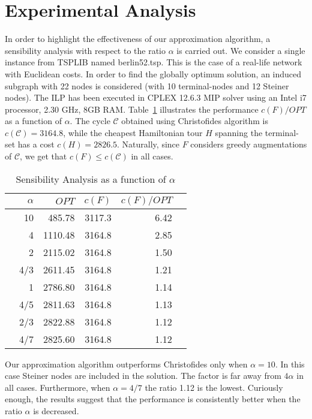 \documentclass{endm}
\begin{document}
\clearpage
\section{Experimental Analysis}\label{Comparison}
In order to highlight the effectiveness of our approximation algorithm, a sensibility
analysis with respect to the ratio $\alpha$ is carried out. We consider a single
instance from TSPLIB named berlin52.tsp. This is the case of a real-life network
with Euclidean costs. In order to find the globally optimum solution, an
induced subgraph with 22 nodes is considered (with 10  terminal-nodes and 12 Steiner nodes).
The ILP has been executed in CPLEX 12.6.3 MIP solver using an Intel i7 processor, 2.30 GHz, 8GB RAM.
Table~\ref{Table:resul1} illustrates the performance $c(F)/OPT$ as a function
of $\alpha$. The cycle $\mathcal{C}$ obtained using Christofides algorithm is
$c(\mathcal{C})=3164.8$, while the cheapest Hamiltonian tour $H$ spanning the terminal-set
has a cost $c(H)=2826.5$. Naturally, since $F$ considers greedy augmentations of
$\mathcal{C}$, we get that $c(F)\leq c(\mathcal{C})$ in all cases.

\begin{table}[H]
\caption{Sensibility Analysis as a function of $\alpha$ \label{Table:resul1}}
\centering
\begin{tabular}{l|r|r|r|r|r}
\toprule
& $\alpha$  & $OPT$ & $c(F)$ & $c(F)/OPT$\\
\midrule
&   10 & 485.78 & 3117.3  & 6.42  \\
&   4 & 1110.48 & 3164.8  & 2.85  \\
&   2 & 2115.02 & 3164.8  & 1.50   \\
&   4/3 & 2611.45 & 3164.8  & 1.21 \\
&   1 & 2786.80  & 3164.8  & 1.14   \\
&   4/5 & 2811.63  & 3164.8  & 1.13 \\
&   2/3 & 2822.88  & 3164.8   & 1.12 \\
&   4/7 & 2825.60  & 3164.8  & 1.12  \\
\bottomrule
\end{tabular}
\end{table}

Our approximation algorithm outperforms Christofides only when $\alpha=10$.
In this case Steiner nodes are included in the solution.
The factor is far away from $4\alpha$ in all cases.
Furthermore, when $\alpha =4/7$ the ratio 1.12 is the lowest. Curiously enough,
the results suggest that the performance is consistently better when the ratio $\alpha$ is
decreased.
\end{document}
